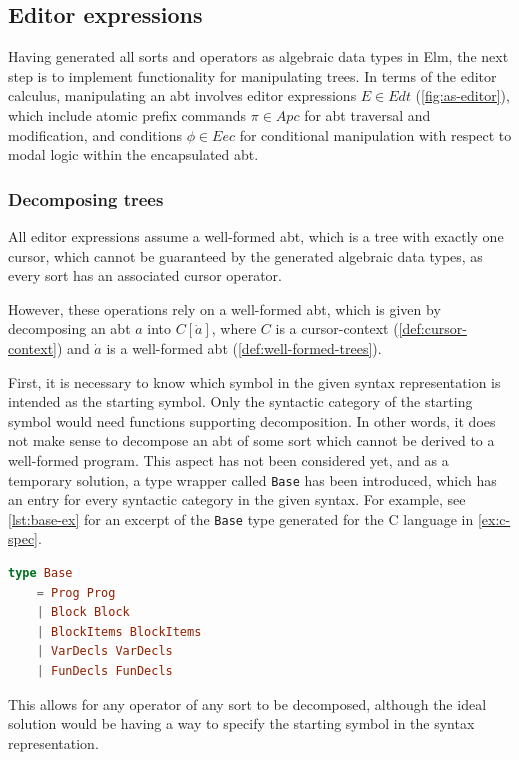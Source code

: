 \subsection{Editor expressions}

Having generated all sorts and operators as algebraic data types in Elm,
the next step is to implement functionality for manipulating trees.
In terms of the editor calculus\cite{aalborg},
manipulating an abt involves editor expressions $E \in Edt$ (\cref{fig:as-editor}),
which include atomic prefix commands $\pi \in Apc$ for abt traversal
and modification, and conditions $\phi \in Eec$ for conditional manipulation with
respect to modal logic within the encapsulated abt.

\subsubsection{Decomposing trees}

All editor expressions assume a well-formed abt, which is a tree
with exactly one cursor, which cannot be guaranteed by the generated
algebraic data types, as every sort has an associated cursor operator.

However, these operations rely on a well-formed abt, which is given
by decomposing an abt $a$ into $C[\dot{a}]$, where $C$ is a
cursor-context (\cref{def:cursor-context}) and $\dot{a}$ is a
well-formed abt (\cref{def:well-formed-trees}).

First, it is necessary to know which symbol in the given syntax representation
is intended as the starting symbol. Only the syntactic category of the starting symbol
would need functions supporting decomposition.
In other words, it does not make sense to decompose an abt of some sort which
cannot be derived to a well-formed program.
This aspect has not been considered yet, and as a temporary solution,
a type wrapper called \texttt{Base} has been introduced, which has an entry for
every syntactic category in the given syntax. For example, see \cref{lst:base-ex}
for an excerpt of the \texttt{Base} type generated for the C language in
\cref{ex:c-spec}.

\begin{lstlisting}[language=elm,style=inline,caption={Example of the Base type},label={lst:base-ex}]
type Base
    = Prog Prog
    | Block Block
    | BlockItems BlockItems
    | VarDecls VarDecls
    | FunDecls FunDecls
\end{lstlisting}

This allows for any operator
of any sort to be decomposed, although the ideal solution would be having
a way to specify the starting symbol in the syntax representation.

